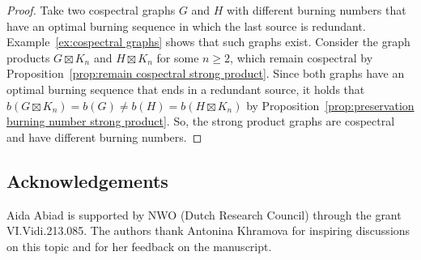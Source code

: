 \documentclass[12pt]{article}
\theoremstyle{plain}
\theoremstyle{definition}
\theoremstyle{remark}
\begin{document}
\begin{proof}
    Take two cospectral graphs $G$ and $H$ with different burning numbers that have an optimal burning sequence in which the last source is redundant. Example~\ref{ex:cospectral graphs} shows that such graphs exist. 
    Consider the graph products $G\boxtimes K_n$ and $H\boxtimes K_n$ for some $n\geq 2$, which remain cospectral by Proposition~\ref{prop:remain cospectral strong product}. Since both graphs have an optimal burning sequence that ends in a redundant source, it holds that $b(G\boxtimes K_n)=b(G)\neq b(H) = b(H\boxtimes K_n)$ by Proposition~\ref{prop:preservation burning number strong product}. 
    So, the strong product graphs are cospectral and have different burning numbers.
\end{proof}



 
\subsection*{Acknowledgements}
Aida Abiad is supported by NWO (Dutch Research Council) through the grant \linebreak VI.Vidi.213.085. The authors thank Antonina Khramova for inspiring discussions on this topic and for her feedback on the manuscript.

\printbibliography[heading=bibintoc]
\end{document}
